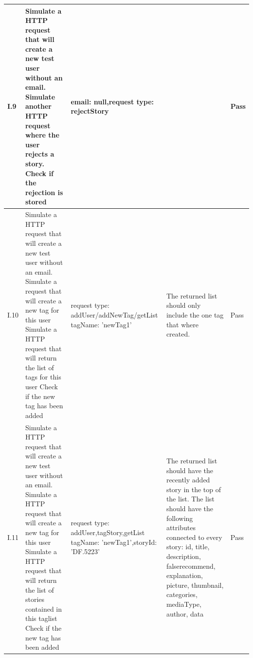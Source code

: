 \begin{appendices}
\begin{center}
\begin{longtable}{ | p{1cm} | p{5.5cm} | p{4cm} | p{4.5cm} | p{2cm}|}
		I.9 & Simulate a HTTP request that will create a new test user without an email. \newline  \newline  Simulate another HTTP request where the user rejects a story.  \newline  \newline Check if the rejection is stored & email: null,\newline request type: rejectStory  &  & Pass \\ \hline
		
		I.10 & Simulate a HTTP request that will create a new test user without an email. \newline  Simulate a  request that will create a new tag for this user \newline Simulate a HTTP request that will return the list of tags for this user \newline Check if the new tag has been added  & request type: addUser/addNewTag/getList  tagName: 'newTag1' & The returned list should only include the one tag that where created.& Pass\\ \hline
		
		I.11 & Simulate a HTTP request that will create a new test user without an email. \newline  Simulate a HTTP request that will create a new tag for this user \newline Simulate a HTTP request that will return the list of stories contained in this taglist \newline Check if the new tag has been added  & request type: addUser,tagStory,getList \newline tagName: 'newTag1',\newline storyId: 'DF.5223' & The returned list should have the recently added story in the top of the list. The list should have the following attributes connected to every story: id, title, description, false\textunderscore recommend, explanation, picture, thumbnail, categories, mediaType, author, data  & Pass\\ \hline
		

\end{longtable}
\end{center}
\end{appendices}
